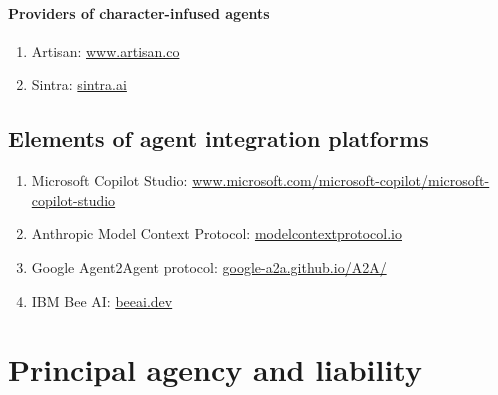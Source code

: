 \documentclass[11pt]{article}
\begin{document}
\paragraph{Providers of character-infused agents}
\begin{enumerate}[wide, labelindent=0pt, itemsep=-1pt, topsep=1pt]
    \item[\textbullet] Artisan: \href{https://www.artisan.co/}{www.artisan.co}
    \item[\textbullet] Sintra: \href{https://sintra.ai/}{sintra.ai}
\end{enumerate}

\subsection{Elements of agent integration platforms}

\begin{enumerate}[wide, labelindent=0pt, itemsep=-1pt, topsep=1pt]
    \item[\textbullet] Microsoft Copilot Studio: \href{https://www.microsoft.com/microsoft-copilot/microsoft-copilot-studio}{www.microsoft.com/microsoft-copilot/microsoft-copilot-studio}
    \item[\textbullet] Anthropic Model Context Protocol: \href{https://modelcontextprotocol.io/}{modelcontextprotocol.io}
    \item[\textbullet] Google Agent2Agent protocol: \href{https://google-a2a.github.io/A2A/}{google-a2a.github.io/A2A/}
    \item[\textbullet] IBM Bee AI: \href{https://beeai.dev/}{beeai.dev}
\end{enumerate}

\section{Principal agency and liability}
\label{sec:pat}
\end{document}
